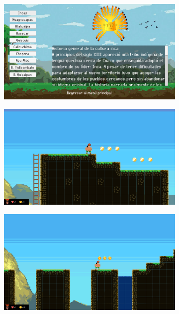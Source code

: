 \documentclass[a4paper, openright, 12pt]{report}
\begin{document}
\begin{figure}[h!]
\begin{subfigure}[b]{0.3\linewidth}
  \end{subfigure}
  \begin{subfigure}[b]{0.3\linewidth}
    \includegraphics[width=\linewidth]{T16_01}
  \end{subfigure}
  \begin{subfigure}[b]{0.3\linewidth}
    \includegraphics[width=\linewidth]{T17_01}
  \end{subfigure}
  \begin{subfigure}[b]{0.3\linewidth}
    \includegraphics[width=\linewidth]{T18_01}

\end{subfigure}
\end{figure}
\end{document}
